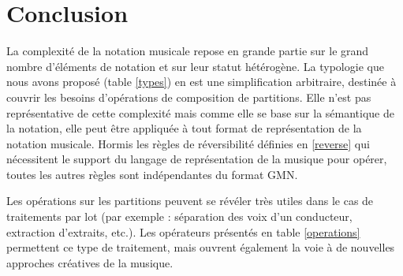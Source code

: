 \documentclass{article}
\begin{document}
\section{Conclusion}

La complexité de la notation musicale repose en grande partie sur le grand nombre d'éléments de notation et sur leur statut hétérogène. La typologie que nous avons proposé (table \ref{types}) en est une simplification arbitraire, destinée à couvrir les besoins d'opérations de composition de partitions. Elle n'est  pas représentative de cette complexité mais comme elle se base sur la sémantique de la notation, elle peut être appliquée à tout format de représentation de la notation musicale.
Hormis les règles de réversibilité définies en \ref{reverse} qui nécessitent le support du langage de représentation de la musique pour opérer, toutes les autres règles sont indépendantes du format GMN.

Les opérations sur les partitions peuvent se révéler très utiles dans le cas de traitements par lot (par exemple : séparation des voix d'un conducteur, extraction d'extraits, etc.).  Les opérateurs présentés en table \ref{operations} permettent ce type de traitement, mais ouvrent également la voie à de nouvelles approches créatives de la musique.



\end{document}
